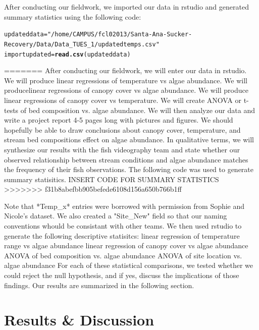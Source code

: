 \documentclass{article}\usepackage[]{graphicx}\usepackage[]{color}
\makeatletter
\newcommand{\hlstr}[1]{\textcolor[rgb]{0.192,0.494,0.8}{#1}}%
\newcommand{\hlstd}[1]{\textcolor[rgb]{0.345,0.345,0.345}{#1}}%
\newcommand{\hlkwb}[1]{\textcolor[rgb]{0.69,0.353,0.396}{#1}}%
\newcommand{\hlkwd}[1]{\textcolor[rgb]{0.737,0.353,0.396}{\textbf{#1}}}%
\newenvironment{kframe}{%
 \def\at@end@of@kframe{}%
 \ifinner\ifhmode%
  \def\at@end@of@kframe{\end{minipage}}%
  \begin{minipage}{\columnwidth}%
 \fi\fi%
 \def\FrameCommand##1{\hskip\@totalleftmargin \hskip-\fboxsep
 \colorbox{shadecolor}{##1}\hskip-\fboxsep
     \hskip-\linewidth \hskip-\@totalleftmargin \hskip\columnwidth}%
 \MakeFramed {\advance\hsize-\width
   \@totalleftmargin\z@ \linewidth\hsize
   \@setminipage}}%
 {\par\unskip\endMakeFramed%
 \at@end@of@kframe}
\newenvironment{knitrout}{}{} %
\makeatother
\begin{document}
After conducting our ﬁeldwork, we imported our data in rstudio and generated summary statistics using the following code: 
\begin{knitrout}
\color{fgcolor}\begin{kframe}
\begin{alltt}
\hlstd{updateddata}\hlkwb{=} \hlstr{"/home/CAMPUS/fcl02013/Santa-Ana-Sucker-Recovery/Data/Data_TUES_1/updatedtemps.csv"}
\hlstd{importupdated}\hlkwb{=}\hlkwd{read.csv}\hlstd{(updateddata)}
\end{alltt}
\end{kframe}
\end{knitrout}
=======
After conducting our ﬁeldwork, we will enter our data in rstudio. We will produce linear regressions of temperature vs algae abundance. We will producelinear regressions of canopy cover vs algae abundance. We will produce linear regressions of canopy cover vs temperature. We will create ANOVA or t-tests of bed composition vs. algae abundance. We will then analyze our data and write a project report 4-5 pages long with pictures and ﬁgures. We should hopefully be able to draw conclusions about canopy cover, temperature, and stream bed compositions eﬀect on algae abundance. In qualitative terms, we will synthesize our results with the ﬁsh videography team and state whether our observed relationship between stream conditions and algae abundance matches the frequency of their ﬁsh observations.
The following code was used to generate summary statisitics. 
INSERT CODE FOR SUMMARY STATISTICS
>>>>>>> f31b8abefbb905befede6108d156a650b766b1ff

Note that *Temp_x* entries were borrowed with permission from Sophie and Nicole's dataset. We also created a "Site_New" field so that our naming conventions whould be consistant with other teams. We then used rstudio to generate the following descriptive statisitcs:  
linear regression of temperature range vs algae abundance
linear regression of canopy cover vs algae abundance
ANOVA of bed composition vs. algae abundance
ANOVA of site location vs. algae abundance
For each of these statistical comparisons, we tested whether we could reject the null hypothesis, and if yes, discuss the implications of those findings. Our results are summarized in the following section. 
\section{Results & Discussion}
\end{document}
